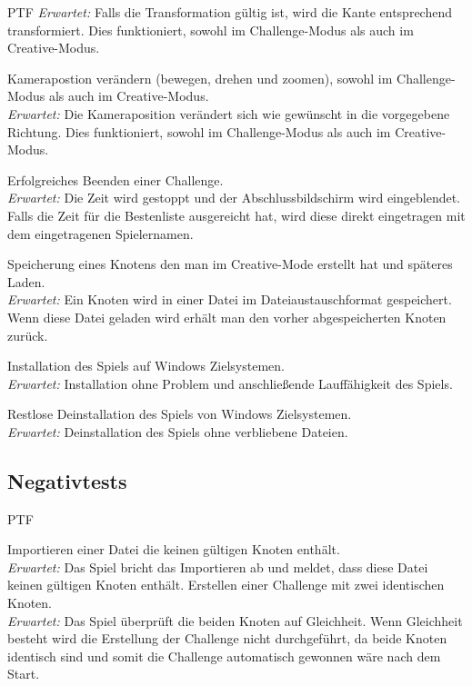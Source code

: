 \begin{ids}{\gls{PTF}}
		\textit{Erwartet:} Falls die Transformation gültig ist, wird die Kante entsprechend transformiert. Dies funktioniert, sowohl im Challenge-Modus als auch im Creative-Modus.

		\id[ 80] Kamerapostion verändern (bewegen, drehen und zoomen), sowohl im Challenge-Modus als auch im Creative-Modus.\\
		
		\textit{Erwartet:} Die Kameraposition verändert sich wie gewünscht in die vorgegebene Richtung. Dies funktioniert, sowohl im Challenge-Modus als auch im Creative-Modus.

		\id[ 90] Erfolgreiches Beenden einer Challenge.\\
		
		\textit{Erwartet:} Die Zeit wird gestoppt und der Abschlussbildschirm wird eingeblendet. Falls die Zeit für die Bestenliste ausgereicht hat, wird diese direkt eingetragen mit dem eingetragenen Spielernamen.

		\id[100] Speicherung eines Knotens den man im Creative-Mode erstellt hat und späteres Laden.\\
		
		\textit{Erwartet:} Ein Knoten wird in einer Datei im Dateiaustauschformat gespeichert. Wenn diese Datei geladen wird erhält man den vorher abgespeicherten Knoten zurück.
		
		\id[120] Installation des Spiels auf Windows Zielsystemen.\\
		
		\textit{Erwartet:} Installation ohne Problem und anschließende Lauffähigkeit des Spiels.

		\id[130] Restlose Deinstallation des Spiels von Windows Zielsystemen.\\
		
		\textit{Erwartet:} Deinstallation des Spiels ohne verbliebene Dateien.
		
	

	\end{ids}


\clearpage


%
%
\subsection{Negativtests}

\begin{ids}{\gls{PTF}}

	\id[500] Importieren einer Datei die keinen gültigen Knoten enthält.\\
	
	\textit{Erwartet:} Das Spiel bricht das Importieren ab und meldet, dass diese Datei keinen gültigen Knoten enthält.
	\id[510] Erstellen einer Challenge mit zwei identischen Knoten.\\
	\textit{Erwartet:} Das Spiel überprüft die beiden Knoten auf Gleichheit. Wenn Gleichheit besteht wird die Erstellung der Challenge nicht durchgeführt, da beide Knoten identisch sind und somit die Challenge automatisch gewonnen wäre nach dem Start.
	

\end{ids}


